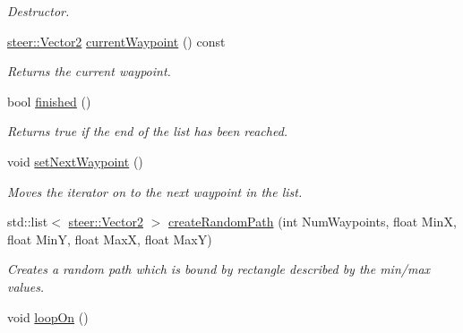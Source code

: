 \begin{DoxyCompactItemize}
\begin{DoxyCompactList}\small\item\em Destructor. \end{DoxyCompactList}\item 
\hypertarget{classsteer_1_1_path_a29340827e82b14da98cc6e10e67bffa6}{\hyperlink{structsteer_1_1_vector2}{steer\-::\-Vector2} \hyperlink{classsteer_1_1_path_a29340827e82b14da98cc6e10e67bffa6}{current\-Waypoint} () const }\label{classsteer_1_1_path_a29340827e82b14da98cc6e10e67bffa6}

\begin{DoxyCompactList}\small\item\em Returns the current waypoint. \end{DoxyCompactList}\item 
\hypertarget{classsteer_1_1_path_af3bf9a7135709983607bccbc1c501c0d}{bool \hyperlink{classsteer_1_1_path_af3bf9a7135709983607bccbc1c501c0d}{finished} ()}\label{classsteer_1_1_path_af3bf9a7135709983607bccbc1c501c0d}

\begin{DoxyCompactList}\small\item\em Returns true if the end of the list has been reached. \end{DoxyCompactList}\item 
\hypertarget{classsteer_1_1_path_a54802e44fde08a217ac9b9ea1321b911}{void \hyperlink{classsteer_1_1_path_a54802e44fde08a217ac9b9ea1321b911}{set\-Next\-Waypoint} ()}\label{classsteer_1_1_path_a54802e44fde08a217ac9b9ea1321b911}

\begin{DoxyCompactList}\small\item\em Moves the iterator on to the next waypoint in the list. \end{DoxyCompactList}\item 
std\-::list$<$ \hyperlink{structsteer_1_1_vector2}{steer\-::\-Vector2} $>$ \hyperlink{classsteer_1_1_path_a6d1d4e9870f39dbec71dcda56044e0e7}{create\-Random\-Path} (int Num\-Waypoints, float Min\-X, float Min\-Y, float Max\-X, float Max\-Y)
\begin{DoxyCompactList}\small\item\em Creates a random path which is bound by rectangle described by the min/max values. \end{DoxyCompactList}\item 
\hypertarget{classsteer_1_1_path_a60efd7a0cc089e1dad6483dd3e378355}{void \hyperlink{classsteer_1_1_path_a60efd7a0cc089e1dad6483dd3e378355}{loop\-On} ()}\label{classsteer_1_1_path_a60efd7a0cc089e1dad6483dd3e378355}


\end{DoxyCompactItemize}
